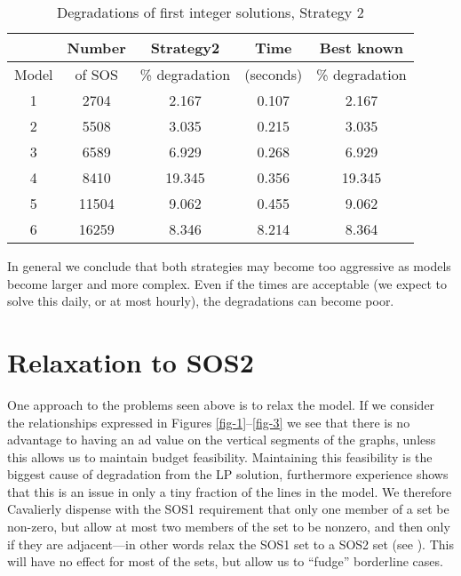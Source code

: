 \documentclass[finalversion,simpleeqnnos]{yrl}
\begin{document}
\begin{table}[htbp]
\begin{centering}
\begin{tabular}{|| c | c | c | c | c ||}
\hline
 & Number & Strategy2 & Time & Best known \\ \hline
Model & of SOS &\% degradation & (seconds) & \% degradation \\ \hline
1 & 2704 & 2.167 & 0.107 & 2.167 \\ \hline
2 & 5508 & 3.035 & 0.215 & 3.035 \\ \hline 
3 & 6589 & 6.929 & 0.268 & 6.929 \\ \hline 
4 & 8410 & 19.345 & 0.356 & 19.345 \\ \hline 
5 & 11504 & 9.062 & 0.455 & 9.062 \\ \hline 
6 & 16259 & 8.346 & 8.214 & 8.364 \\ \hline 
\end{tabular}
\caption{Degradations of first integer solutions, Strategy 2}
\label{strat2}
\end{centering}
\end{table}


In general we conclude that both strategies may become too aggressive as models become larger and more complex. Even if the times are acceptable (we expect to solve this daily, or at most hourly), the degradations can become poor.

\section{Relaxation to SOS2}

One approach to the problems seen above is to relax the model. If we consider the relationships expressed in Figures \ref{fig-1}--\ref{fig-3} we see that there is no advantage to having an ad value on the vertical segments of the graphs, unless this allows us to maintain budget feasibility. Maintaining this feasibility is the biggest cause of degradation from the LP solution, furthermore experience shows that this is an issue in only a tiny fraction of the lines in the model. We therefore Cavalierly dispense with the SOS1 requirement that only one member of a set be non-zero, but allow at most two members of the set to be nonzero, and then only if they are adjacent---in other words relax the SOS1 set to a SOS2 set (see \cite{F-T}). This will have no effect for most of the sets, but allow us to ``fudge'' borderline cases.
\end{document}
